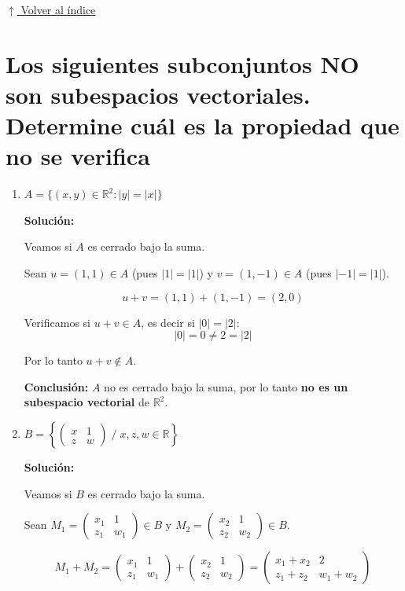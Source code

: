 \documentclass[12pt]{article}
\newcommand{\solucion}{%
    \vspace{0.8em}%
    \textbf{Solución:}%
    \vspace{0.8em}%
}
\newcommand{\volverindice}{%
    \vspace{1em}%
    \begin{flushright}%
        \hyperlink{indice}{\small $\uparrow$ Volver al índice}%
    \end{flushright}%
}
\begin{document}
\volverindice
\newpage

\section{Los siguientes subconjuntos NO son subespacios vectoriales. Determine cuál es la propiedad que no se verifica}

\begin{enumerate}[label=\alph*.-]
    \item $A = \{(x,y) \in \mathbb{R}^2 : |y| = |x|\}$

    \solucion

    Veamos si $A$ es cerrado bajo la suma.

    Sean $u=(1,1) \in A$ (pues $|1|=|1|$) y $v=(1,-1) \in A$ (pues $|-1|=|1|$).

    \[
    u+v = (1,1)+(1,-1) = (2,0)
    \]

    Verificamos si $u+v \in A$, es decir si $|0|=|2|$:
    \[
    |0| = 0 \neq 2 = |2|
    \]

    Por lo tanto $u+v \notin A$.

    \textbf{Conclusión:} $A$ no es cerrado bajo la suma, por lo tanto \textbf{no es un subespacio vectorial} de $\mathbb{R}^2$.

    \item $B = \left\{ \begin{pmatrix} x & 1 \\ z & w \end{pmatrix} \; \Big/ \; x,z,w \in \mathbb{R} \right\}$

    \solucion

    Veamos si $B$ es cerrado bajo la suma.

    Sean $M_1=\begin{pmatrix}x_1 & 1\\ z_1 & w_1\end{pmatrix} \in B$ y $M_2=\begin{pmatrix}x_2 & 1\\ z_2 & w_2\end{pmatrix} \in B$.

    \[
    M_1+M_2 = \begin{pmatrix}x_1 & 1\\ z_1 & w_1\end{pmatrix}+\begin{pmatrix}x_2 & 1\\ z_2 & w_2\end{pmatrix} = \begin{pmatrix}x_1+x_2 & 2\\ z_1+z_2 & w_1+w_2\end{pmatrix}
    \]


\end{enumerate}
\end{document}
